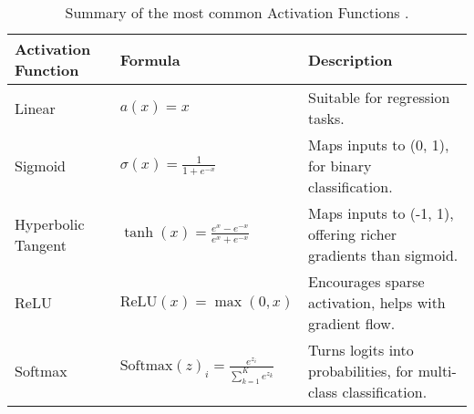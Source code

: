 \begin{table}[htb!]
\centering
\footnotesize
\begin{tabularx}{\textwidth}{@{}lXl@{}}
\toprule
\textbf{Activation Function} & \textbf{Formula} & \textbf{Description} \\
\midrule
Linear & \( a(x) = x \) & Suitable for regression tasks. \\
\addlinespace
Sigmoid & \( \sigma(x) = \frac{1}{1 + e^{-x}} \) & Maps inputs to (0, 1), for binary classification. \\
\addlinespace
Hyperbolic Tangent & \( \tanh(x) = \frac{e^{x} - e^{-x}}{e^{x} + e^{-x}} \) & Maps inputs to (-1, 1), offering richer gradients than sigmoid. \\
\addlinespace
ReLU & \( \text{ReLU}(x) = \max(0, x) \) & Encourages sparse activation, helps with gradient flow. \\
\addlinespace
Softmax & \( \text{Softmax}(z)_i = \frac{e^{z_i}}{\sum_{k=1}^K e^{z_k}} \) & Turns logits into probabilities, for multi-class classification. \\
\bottomrule
\end{tabularx}
\caption{Summary of the most common Activation Functions \cite{goodfellow_deep_2016}.}
\label{Tables:ActivationFunctions}
\end{table}
